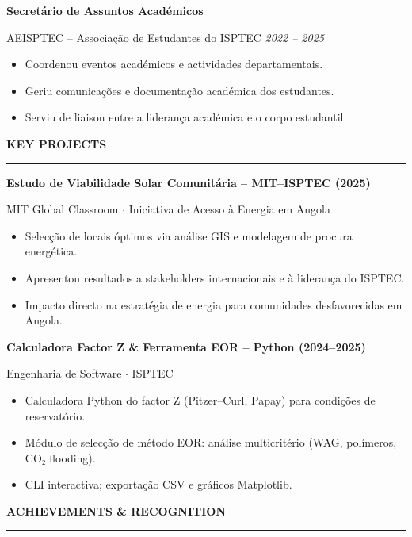 \documentclass[10pt,a4paper]{article}
\renewcommand{\textbf}[1]{{\bfseries\color{cvgold}#1}}
\newcommand{\mainSection}[1]{%
  \vspace{1pt}%
  {\bfseries\color{cvgold}\large\MakeUppercase{#1}}%
  \par\vspace{0pt}%
  {\color{cvgold}\rule{\linewidth}{0.9pt}}%
  \par\vspace{1pt}%
}
\newcommand{\expEntry}[3]{%
  {\bfseries\color{cvgold}\normalsize #1}\par\vspace{1pt}%
  {\color{cvmuted}\small #2 \hfill \textit{\color{cvgoldlt}#3}}\par\vspace{1pt}%
}
\begin{document}
\begin{minipage}[t]{\dimexpr 0.705\paperwidth - 26pt}
  \vspace{2pt}
  \expEntry{Secretário de Assuntos Académicos}%
           {AEISPTEC -- Associação de Estudantes do ISPTEC}%
           {2022 – 2025}
  \begin{itemize}
    \item Coordenou eventos académicos e actividades departamentais.
    \item Geriu comunicações e documentação académica dos estudantes.
    \item Serviu de liaison entre a liderança académica e o corpo estudantil.
  \end{itemize}

  \mainSection{Key Projects}

  \textbf{Estudo de Viabilidade Solar Comunitária -- MIT–ISPTEC (2025)}\par
  {\color{cvgoldlt}\small MIT Global Classroom $\cdot$ Iniciativa de Acesso à Energia em Angola}
  \begin{itemize}
    \item Selecção de locais óptimos via análise GIS e modelagem de procura energética.
    \item Apresentou resultados a stakeholders internacionais e à liderança do ISPTEC.
    \item Impacto directo na estratégia de energia para comunidades desfavorecidas em Angola.
  \end{itemize}

  \vspace{2pt}
  \textbf{Calculadora Factor Z \& Ferramenta EOR -- Python (2024–2025)}\par
  {\color{cvgoldlt}\small Engenharia de Software $\cdot$ ISPTEC}
  \begin{itemize}
    \item Calculadora Python do factor Z (Pitzer–Curl, Papay) para condições de reservatório.
    \item Módulo de selecção de método EOR: análise multicritério (WAG, polímeros, CO₂ flooding).
    \item CLI interactiva; exportação CSV e gráficos Matplotlib.
  \end{itemize}

  \mainSection{Achievements \& Recognition}


\end{minipage}
\end{document}
